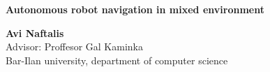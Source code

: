 \documentclass[a0,portrait]{a0poster}
\begin{document}


\begin{minipage}[b]{1\linewidth}
\VeryHuge \color{NavyBlue} \textbf{Autonomous robot navigation in mixed environment} \color{Black}\\ %

\vspace{1cm} %

\huge \textbf{Avi Naftalis}\\[0.6cm] %
\huge Advisor: Proffesor Gal Kaminka \\[0.5cm] %
\huge Bar-Ilan university, department of computer science \\[0.5cm] %
\end{minipage}
%
\begin{minipage}[b]{0.25\linewidth}
\end{minipage}

\vspace{1cm} %

\end{document}
